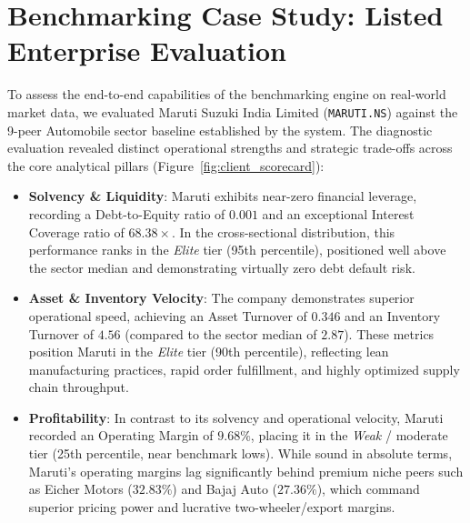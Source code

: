 \section{Benchmarking Case Study: Listed Enterprise Evaluation}
To assess the end-to-end capabilities of the benchmarking engine on real-world market data, we evaluated Maruti Suzuki India Limited (\texttt{MARUTI.NS}) against the 9-peer Automobile sector baseline established by the system. The diagnostic evaluation revealed distinct operational strengths and strategic trade-offs across the core analytical pillars (Figure~\ref{fig:client_scorecard}):
\begin{itemize}
    \item \textbf{Solvency \& Liquidity}: Maruti exhibits near-zero financial leverage, recording a Debt-to-Equity ratio of $0.001$ and an exceptional Interest Coverage ratio of $68.38\times$. In the cross-sectional distribution, this performance ranks in the \textit{Elite} tier (95th percentile), positioned well above the sector median and demonstrating virtually zero debt default risk.
    \item \textbf{Asset \& Inventory Velocity}: The company demonstrates superior operational speed, achieving an Asset Turnover of $0.346$ and an Inventory Turnover of $4.56$ (compared to the sector median of $2.87$). These metrics position Maruti in the \textit{Elite} tier (90th percentile), reflecting lean manufacturing practices, rapid order fulfillment, and highly optimized supply chain throughput.
    \item \textbf{Profitability}: In contrast to its solvency and operational velocity, Maruti recorded an Operating Margin of $9.68\%$, placing it in the \textit{Weak} / moderate tier (25th percentile, near benchmark lows). While sound in absolute terms, Maruti's operating margins lag significantly behind premium niche peers such as Eicher Motors ($32.83\%$) and Bajaj Auto ($27.36\%$), which command superior pricing power and lucrative two-wheeler/export margins.
\end{itemize}

